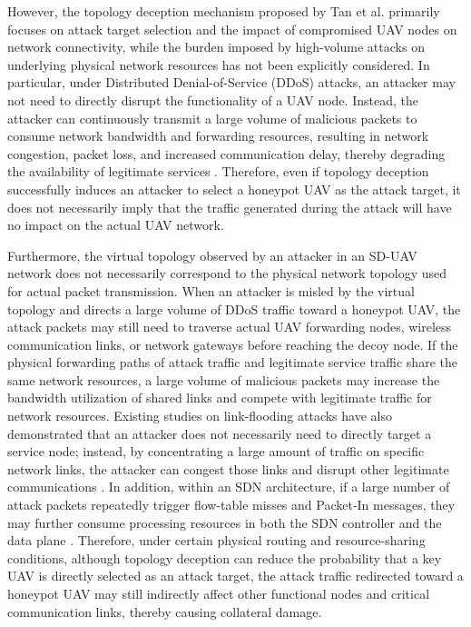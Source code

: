 \begin{ZhChapter}
However, the topology deception mechanism proposed by Tan et al. \cite{tan:2022} primarily focuses on attack target selection and the impact of compromised UAV nodes on network connectivity, while the burden imposed by high-volume attacks on underlying physical network resources has not been explicitly considered. In particular, under Distributed Denial-of-Service (DDoS) attacks, an attacker may not need to directly disrupt the functionality of a UAV node. Instead, the attacker can continuously transmit a large volume of malicious packets to consume network bandwidth and forwarding resources, resulting in network congestion, packet loss, and increased communication delay, thereby degrading the availability of legitimate services \cite{ouldrabah:2024}. Therefore, even if topology deception successfully induces an attacker to select a honeypot UAV as the attack target, it does not necessarily imply that the traffic generated during the attack will have no impact on the actual UAV network.

Furthermore, the virtual topology observed by an attacker in an SD-UAV network does not necessarily correspond to the physical network topology used for actual packet transmission. When an attacker is misled by the virtual topology and directs a large volume of DDoS traffic toward a honeypot UAV, the attack packets may still need to traverse actual UAV forwarding nodes, wireless communication links, or network gateways before reaching the decoy node. If the physical forwarding paths of attack traffic and legitimate service traffic share the same network resources, a large volume of malicious packets may increase the bandwidth utilization of shared links and compete with legitimate traffic for network resources. Existing studies on link-flooding attacks have also demonstrated that an attacker does not necessarily need to directly target a service node; instead, by concentrating a large amount of traffic on specific network links, the attacker can congest those links and disrupt other legitimate communications \cite{kang:2013}. In addition, within an SDN architecture, if a large number of attack packets repeatedly trigger flow-table misses and Packet-In messages, they may further consume processing resources in both the SDN controller and the data plane \cite{wang:2015}. Therefore, under certain physical routing and resource-sharing conditions, although topology deception can reduce the probability that a key UAV is directly selected as an attack target, the attack traffic redirected toward a honeypot UAV may still indirectly affect other functional nodes and critical communication links, thereby causing collateral damage.


\end{ZhChapter}
